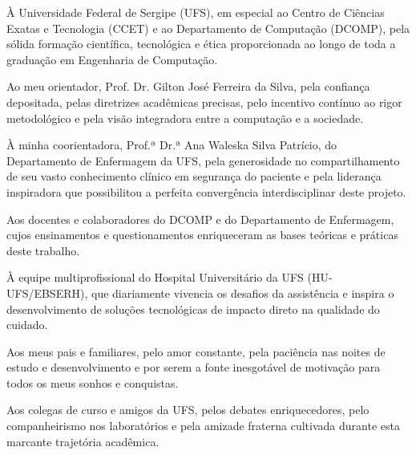 \begin{agradecimentos}
À Universidade Federal de Sergipe (UFS), em especial ao Centro de Ciências Exatas e Tecnologia (CCET) e ao Departamento de Computação (DCOMP), pela sólida formação científica, tecnológica e ética proporcionada ao longo de toda a graduação em Engenharia de Computação.

Ao meu orientador, Prof. Dr. Gilton José Ferreira da Silva, pela confiança depositada, pelas diretrizes acadêmicas precisas, pelo incentivo contínuo ao rigor metodológico e pela visão integradora entre a computação e a sociedade.

À minha coorientadora, Prof.ª Dr.ª Ana Waleska Silva Patrício, do Departamento de Enfermagem da UFS, pela generosidade no compartilhamento de seu vasto conhecimento clínico em segurança do paciente e pela liderança inspiradora que possibilitou a perfeita convergência interdisciplinar deste projeto.

Aos docentes e colaboradores do DCOMP e do Departamento de Enfermagem, cujos ensinamentos e questionamentos enriqueceram as bases teóricas e práticas deste trabalho.

À equipe multiprofissional do Hospital Universitário da UFS (HU-UFS/EBSERH), que diariamente vivencia os desafios da assistência e inspira o desenvolvimento de soluções tecnológicas de impacto direto na qualidade do cuidado.

Aos meus pais e familiares, pelo amor constante, pela paciência nas noites de estudo e desenvolvimento e por serem a fonte inesgotável de motivação para todos os meus sonhos e conquistas.

Aos colegas de curso e amigos da UFS, pelos debates enriquecedores, pelo companheirismo nos laboratórios e pela amizade fraterna cultivada durante esta marcante trajetória acadêmica.
\end{agradecimentos}